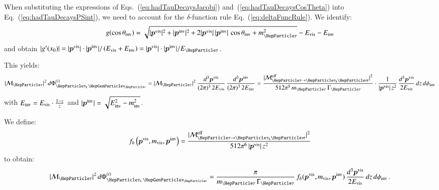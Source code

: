 When substituting the expressions of Eqs.~(\ref{eq:hadTauDecaysJacobi}) and~(\ref{eq:hadTauDecaysCosTheta}) into Eq.~(\ref{eq:hadTauDecaysPSint}),
we need to account for the $\delta$-function rule
Eq.~(\ref{eq:deltaFuncRule}).
We identify:
\begin{equation} 
g(\cos\theta_{\inv}) = \sqrt{\vert\bm{p^{\vis}}\vert^{2} + \vert\bm{p^{\inv}}\vert^{2}
  + 2 \vert\bm{p^{\vis}}\vert \, \vert\bm{p^{\inv}}\vert \,
  \cos\theta_{\inv} + m^{2}_{\Pgt}} - E_{\vis} - E_{\inv}
\end{equation}
and obtain $\vert g'(x_{0}) \vert = \vert\bm{p^{\vis}}\vert \cdot
\vert\bm{p^{\inv}}\vert / \left( E_{\vis} + E_{\inv} \right) = \vert\bm{p^{\vis}}\vert \cdot
\vert\bm{p^{\inv}}\vert / E_{\Pgt}$.

This yields:
\begin{equation}
 \vert\mathcal{M}_{\Pgt}\vert^{2} \,
 d\Phi^{(i)}_{\tauhnu} = \vert\mathcal{M}_{\Pgt}\vert^{2} \, \frac{d^{3}\bm{p^{\vis}}}{(2\pi)^{3} \, 2
   E_{\vis}} \, \frac{d^{3}\bm{p^{\inv}}}{(2\pi)^{3} \, 2 E_{\inv}}
= \frac{\vert\mathcal{M}^{\eff}_{\Pgt \to
  \tauh\Pnut}\vert^{2}}{512\pi^{5}\, m_{\Pgt} \, \Gamma_{\Pgt}} \cdot 
    \frac{1}{\vert\bm{p^{\vis}}\vert \, z^{2}} \, 
    \frac{d^{3}\bm{p^{\vis}}}{2 E_{\vis}} \, dz \, d\phi_{\inv}
\label{eq:hadTauDecaysResult}
\end{equation}
with $E_{\textrm{inv}} = E_{\textrm{vis}} \cdot \frac{1 - z}{z}$ and $\vert\bm{p^{\textrm{inv}}}\vert = \sqrt{E^{2}_{\textrm{inv}} - m^{2}_{\textrm{inv}}}$.

We define:
\begin{equation}
f_{h}\left(\bm{p^{\vis}}, m_{\vis}, \bm{p^{\inv}}\right) = 
  \frac{\vert\mathcal{M}^{\eff}_{\Pgt \to
  \tauh\Pnut}\vert^{2}}{512\pi^{6} \, \vert\bm{p^{\vis}}\vert \, z^{2}} 
\label{eq:hadTauDecays_f}
\end{equation}
to obtain:
\begin{equation}
\vert\mathcal{M}_{\Pgt}\vert^{2} \,
 d\Phi^{(i)}_{\tauhnu} = \frac{\pi}{m_{\Pgt} \, \Gamma_{\Pgt}} \,
 f_{h}(\bm{p^{\vis}}, m_{\vis}, \bm{p^{\inv}}) \, \frac{d^{3}\bm{p^{\vis}}}{2 E_{\vis}} \, dz \, d\phi_{\inv}
 \, .
\end{equation}
